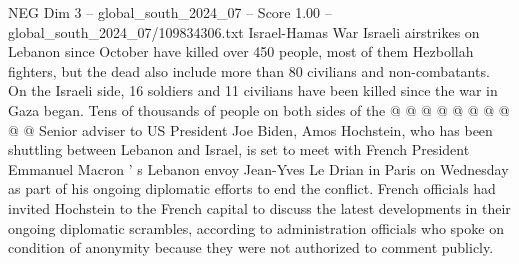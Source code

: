 \begin{textsample}{NEG Dim 3 – global\_south\_2024\_07 – Score 1.00 – global\_south\_2024\_07/109834306.txt}
Israel-Hamas War Israeli airstrikes on Lebanon since October have killed over 450 people, most of them Hezbollah fighters, but the dead also include more than 80 civilians and non-combatants.
On the Israeli side, 16 soldiers and 11 civilians have been killed since the war in Gaza began.
Tens of thousands of people on both sides of the @ @ @ @ @ @ @ @ @ @ Senior adviser to US President Joe Biden, Amos Hochstein, who has been shuttling between Lebanon and Israel, is set to meet with French President Emmanuel Macron ' s Lebanon envoy Jean-Yves Le Drian in Paris on Wednesday as part of his ongoing diplomatic efforts to end the conflict.
French officials had invited Hochstein to the French capital to discuss the latest developments in their ongoing diplomatic scrambles, according to administration officials who spoke on condition of anonymity because they were not authorized to comment publicly.

\end{textsample}
